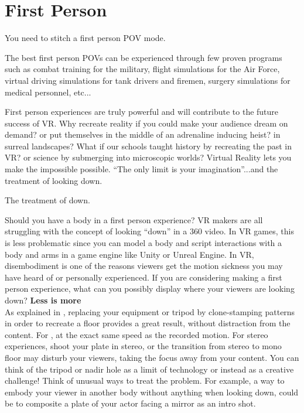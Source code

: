 \chapter{First Person}
\pagecolor{white}
\label{chap:44}
\begin{fullwidth}

\problem

{\large You need to stitch a first person POV mode. \par}

The best first person POVs can be experienced through few proven programs such as combat training for the military, flight simulations for the Air Force, virtual driving simulations for tank drivers and firemen, surgery simulations for medical personnel, etc... 

First person experiences are truly powerful and will contribute to the future success of VR. Why recreate reality if you could make your audience dream on demand? or put themselves in the middle of an adrenaline inducing heist? in surreal landscapes? What if our schools taught history by recreating the past in VR? or science by submerging into microscopic worlds? Virtual Reality lets you make the impossible possible. “The only limit is your imagination”...and the treatment of looking down.

\solution

{\large The treatment of down. \par}

Should you have a body in a first person experience? VR makers are all struggling with the concept of looking “down” in a 360 video. In VR games, this is less problematic since you can model a body and script interactions with a body and arms in a game engine like Unity or Unreal Engine. In VR, disembodiment is one of the reasons viewers get the motion sickness you may have heard of or personally experienced. If you are considering making a first person experience, what can you possibly display where your viewers are looking down? 
\clearpage
{\bfseries Less is more}
\\
As explained in \textbf{}, replacing your equipment or tripod by clone-stamping patterns in order to recreate a floor provides a great result, without distraction from the content. For \textbf{}, \textbf{} at the exact same speed as the recorded motion. For stereo experiences, shoot your plate in stereo, or the transition from stereo to mono floor may disturb your viewers, taking the focus away from your content. You can think of the tripod or nadir hole as a limit of technology or instead as a creative challenge! Think of unusual ways to treat the problem. For example, a way to embody your viewer in another body without anything when looking down, could be to composite a plate of your actor facing a mirror as an intro shot.


\end{fullwidth}
